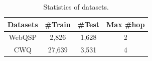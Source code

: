 \begin{table}[]
    \centering
    \caption{Statistics of datasets.}
    \label{tab:dataset}
    \begin{tabular}{@{}c|ccc@{}}
        \toprule
        Datasets & \#Train & \#Test & Max \#hop \\ \midrule
        WebQSP   & 2,826   & 1,628  & 2         \\
        CWQ      & 27,639  & 3,531  & 4         \\ \bottomrule
    \end{tabular}%
\end{table}